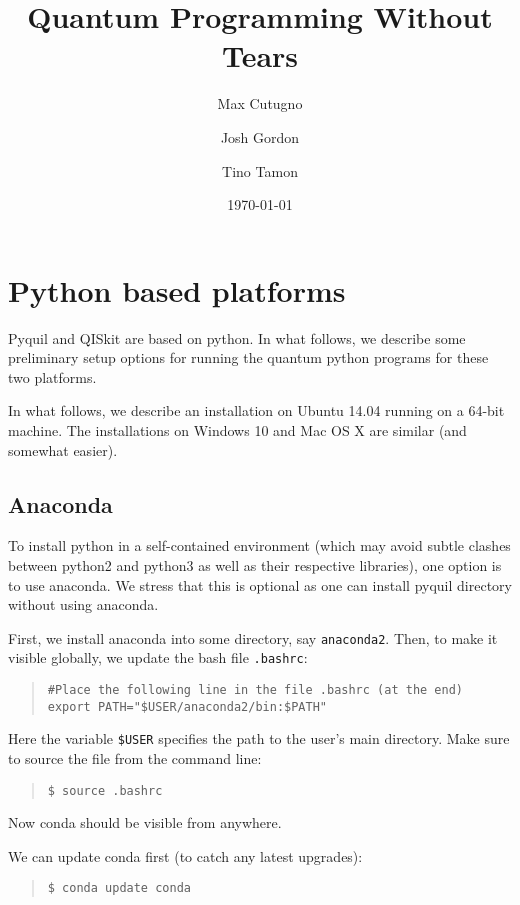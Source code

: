\documentclass[12pt]{book}
\title{Quantum Programming Without Tears}
\author{
Max Cutugno 
\and
Josh Gordon
\and
Tino Tamon
}
\date{\today}
\begin{document}
\maketitle
\tableofcontents



\chapter{Python based platforms}

Pyquil and QISkit are based on python. In what follows, we describe some preliminary setup
options for running the quantum python programs for these two platforms.

In what follows, we describe an installation on Ubuntu 14.04 running on a 64-bit machine.
The installations on Windows 10 and Mac OS X are similar (and somewhat easier).



\section{Anaconda}

To install python in a self-contained environment (which may avoid subtle clashes between python2 
and python3 as well as their respective libraries), one option is to use anaconda. 
We stress that this is optional as one can install pyquil directory without using anaconda.

First, we install anaconda into some directory, say {\tt anaconda2}.
Then, to make it visible globally, we update the bash file {\tt .bashrc}:
\begin{quote}
\begin{verbatim}
#Place the following line in the file .bashrc (at the end)
export PATH="$USER/anaconda2/bin:$PATH"
\end{verbatim}
\end{quote}
Here the variable {\tt \$USER} specifies the path to the user's main directory.
Make sure to source the file from the command line:
\begin{quote}
\begin{verbatim}
$ source .bashrc
\end{verbatim}
\end{quote}
Now conda should be visible from anywhere.

We can update conda first (to catch any latest upgrades):
\begin{quote}
\begin{verbatim}
$ conda update conda
\end{verbatim}
\end{quote}
\end{document}
